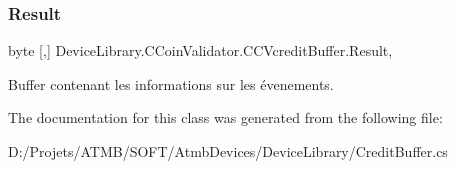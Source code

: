 \subsubsection{\texorpdfstring{Result}{Result}}
{\footnotesize\ttfamily byte \mbox{[},\mbox{]} Device\+Library.\+C\+Coin\+Validator.\+C\+C\+Vcredit\+Buffer.\+Result\hspace{0.3cm}{\ttfamily [get]}, {\ttfamily [set]}}



Buffer contenant les informations sur les évenements. 



The documentation for this class was generated from the following file\+:\begin{DoxyCompactItemize}
\item 
D\+:/\+Projets/\+A\+T\+M\+B/\+S\+O\+F\+T/\+Atmb\+Devices/\+Device\+Library/Credit\+Buffer.\+cs\end{DoxyCompactItemize}
